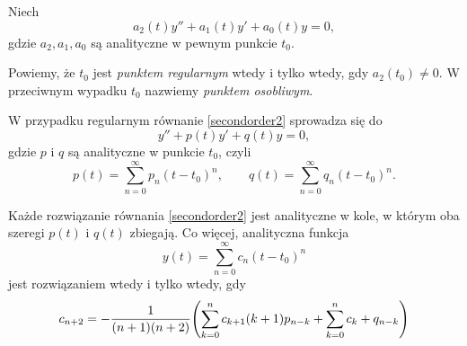 
\noindent Niech
\begin{equation} \label{secondorder1}
  a_2(t)y'' + a_1(t)y' + a_0(t)y = 0,
\end{equation}
gdzie $a_2,a_1,a_0$ są analityczne w pewnym punkcie $t_0$.

\begin{definition}
  Powiemy, że $t_0$ jest \emph{punktem regularnym} wtedy i tylko wtedy, gdy $a_2(t_0) \not= 0$.
  W przeciwnym wypadku $t_0$ nazwiemy \emph{punktem osobliwym}.
\end{definition}

\noindent W przypadku regularnym równanie \eqref{secondorder2} sprowadza się do
\begin{equation} \label{secondorder2}
  y'' + p(t)y' + q(t)y = 0,
\end{equation}
gdzie $p$ i $q$ są analityczne w punkcie $t_0$, czyli
\[
  p(t) = \sum_{n=0}^{\infty}p_n(t - t_0)^n, \qquad q(t) = \sum_{n=0}^{\infty}q_n(t - t_0)^n.
\]

\begin{theorem}
  Każde rozwiązanie równania \eqref{secondorder2} jest analityczne w kole, w którym oba szeregi
  $p(t)$ i $q(t)$ zbiegają. Co więcej, analityczna funkcja
  \[
    y(t) = \sum_{n=0}^{\infty}c_n(t - t_0)^n
  \]
  jest rozwiązaniem wtedy i tylko wtedy, gdy
  \[
    c_{n+2} = - \frac{1}{(n+1)(n+2)} \p*{ \sum_{k=0}^{n} c_{k+1}(k+1)p_{n-k} + \sum_{k=0}^{n} c_k + q_{n-k} }
  \]
\end{theorem}